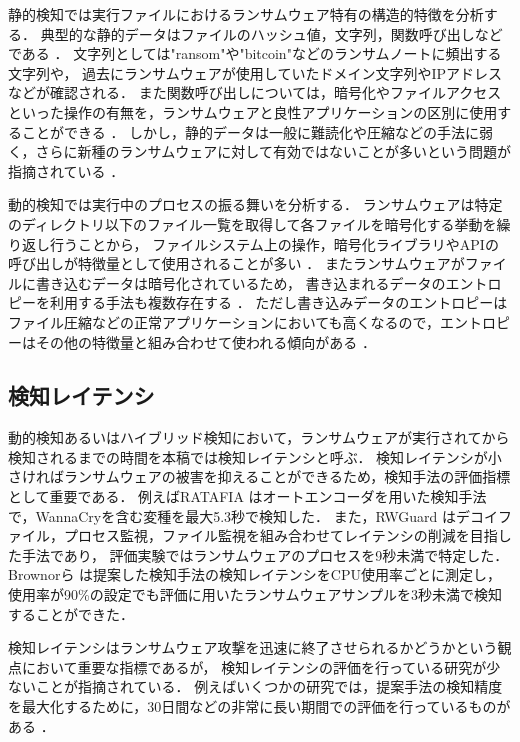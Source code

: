 静的検知では実行ファイルにおけるランサムウェア特有の構造的特徴を分析する．
典型的な静的データはファイルのハッシュ値，文字列，関数呼び出しなどである ．
文字列としては"ransom"や"bitcoin"などのランサムノートに頻出する文字列や，
過去にランサムウェアが使用していたドメイン文字列やIPアドレスなどが確認される\cite{berrueta2019survey}．
また関数呼び出しについては，暗号化やファイルアクセスといった操作の有無を，ランサムウェアと良性アプリケーションの区別に使用することができる \cite{Evolution-Ransomware}．
しかし，静的データは一般に難読化や圧縮などの手法に弱く，さらに新種のランサムウェアに対して有効ではないことが多いという問題が指摘されている \cite{mitigation-modern}．

動的検知では実行中のプロセスの振る舞いを分析する．
ランサムウェアは特定のディレクトリ以下のファイル一覧を取得して各ファイルを暗号化する挙動を繰り返し行うことから，
ファイルシステム上の操作，暗号化ライブラリやAPIの呼び出しが特徴量として使用されることが多い \cite{Evolution-Ransomware}．
またランサムウェアがファイルに書き込むデータは暗号化されているため，
書き込まれるデータのエントロピーを利用する手法も複数存在する \cite{kharaz2016unveil,kharraz2017redemption}．
ただし書き込みデータのエントロピーはファイル圧縮などの正常アプリケーションにおいても高くなるので，エントロピーはその他の特徴量と組み合わせて使われる傾向がある \cite{berrueta2019survey}．

\subsection{検知レイテンシ}
動的検知あるいはハイブリッド検知において，ランサムウェアが実行されてから検知されるまでの時間を本稿では検知レイテンシと呼ぶ．
検知レイテンシが小さければランサムウェアの被害を抑えることができるため，検知手法の評価指標として重要である．
例えばRATAFIA \cite{alam2019ratafia} はオートエンコーダを用いた検知手法で，WannaCryを含む変種を最大5.3秒で検知した．
また，RWGuard \cite{mehnaz2018rwguard} はデコイファイル，プロセス監視，ファイル監視を組み合わせてレイテンシの削減を目指した手法であり，
評価実験ではランサムウェアのプロセスを9秒未満で特定した．
Brownorら \cite{brownor2024ransomware} は提案した検知手法の検知レイテンシをCPU使用率ごとに測定し，
使用率が90\%の設定でも評価に用いたランサムウェアサンプルを3秒未満で検知することができた．

検知レイテンシはランサムウェア攻撃を迅速に終了させられるかどうかという観点において重要な指標であるが，
検知レイテンシの評価を行っている研究が少ないことが指摘されている\cite{alam2019ratafia}．
例えばいくつかの研究では，提案手法の検知精度を最大化するために，30日間などの非常に長い期間での評価を行っているものがある \cite{mitigation-modern}．

